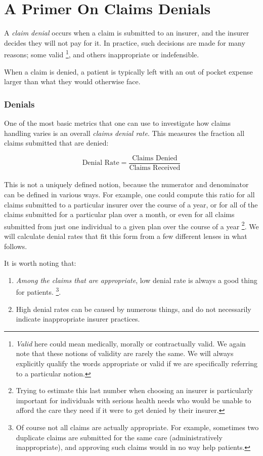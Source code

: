 \documentclass[12pt, a4paper,twoside,parskip=full]{report}
\theoremstyle{plain} %
\theoremstyle{definition} %
\theoremstyle{remark} %
\numberwithin{equation}{chapter}
\begin{document}
		\chapter{A Primer On Claims Denials}\label{primer}
		
		A \emph{claim denial} occurs when a claim is submitted to an insurer, and the insurer decides they will not pay for it. In practice, such decisions are made for many reasons; some valid \footnote{\emph{Valid} here could mean medically, morally or contractually valid. We again note that these notions of validity are rarely the same. We will always explicitly qualify the words appropriate or valid if we are specifically referring to a particular notion.}, and others inappropriate or indefensible.
		
		When a claim is denied, a patient is typically left with an out of pocket expense larger than what they would otherwise face.

		\subsection{Denials}
		
		One of the most basic metrics that one can use to investigate how claims handling varies is an overall \emph{claims denial rate}. This measures the fraction all claims submitted that are denied:
		
		\begin{equation*}
			\text{Denial Rate} = \dfrac{\text{Claims Denied}}{\text{Claims Received}}
		\end{equation*}
		\hfill\\
		This is not a uniquely defined notion, because the numerator and denominator can be defined in various ways. For example, one could compute this ratio for all claims submitted to a particular insurer over the course of a year, or for all of the claims submitted for a particular plan over a month, or even for all claims submitted from just one individual to a given plan over the course of a year \footnote{Trying to estimate this last number when choosing an insurer is particularly important for individuals with serious health needs who would be unable to afford the care they need if it were to get denied by their insurer.}. We will calculate denial rates that fit this form from a few different lenses in what follows.
		
		It is worth noting that:
		
		\begin{enumerate}
			\item \emph{Among the claims that are appropriate}, low denial rate is always a good thing for patients. \footnote{Of course not all claims are actually appropriate. For example, sometimes two duplicate claims are submitted for the same care (administratively inappropriate), and approving such claims would in no way help patients. }.
			\item High denial rates can be caused by numerous things, and do not necessarily indicate inappropriate insurer practices.
		\end{enumerate}
		
\end{document}
